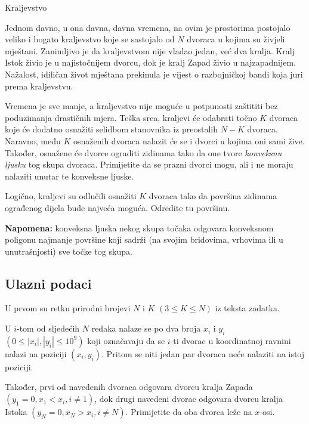 \begin{statement}[
  problempoints=100,
  timelimit=1 sekunda,
  memorylimit=512 MiB,
]{Kraljevstvo}

Jednom davno, u ona davna, davna vremena, na ovim je prostorima postojalo
veliko i bogato kraljevstvo koje se sastojalo od $N$ dvoraca u kojima su živjeli
mještani. Zanimljivo je da kraljevstvom nije vladao jedan, već dva kralja.
Kralj Istok živio je u najistočnijem dvorcu, dok je kralj Zapad živio u
najzapadnijem. Nažalost, idiličan život mještana prekinula je vijest o
razbojničkoj bandi koja juri prema kraljevstvu.

Vremena je sve manje, a kraljevstvo nije moguće u potpunosti zaštititi bez
poduzimanja drastičnih mjera. Teška srca, kraljevi će odabrati točno $K$
dvoraca koje će dodatno osnažiti selidbom stanovnika iz preostalih $N - K$
dvoraca. Naravno, među $K$ osnaženih dvoraca nalazit će se i dvorci u kojima
oni sami žive.  Također, osnažene će dvorce ograditi zidinama tako da one
tvore \textit{konveksnu ljusku} tog skupa dvoraca. Primijetite da se prazni
dvorci mogu, ali i ne moraju nalaziti unutar te konveksne ljuske.

Logično, kraljevi su odlučili osnažiti $K$ dvoraca tako da površina zidinama
ograđenog dijela bude najveća moguća. Odredite tu površinu.

\textbf{Napomena:} konveksna ljuska nekog skupa točaka odgovara konveksnom
poligonu najmanje površine koji sadrži (na svojim bridovima, vrhovima ili
u unutrašnjosti) sve točke tog skupa.

\subsection*{Ulazni podaci}
U prvom su retku prirodni brojevi $N$ i $K$ $(3 \le K \le N)$ iz teksta zadatka.

U $i$-tom od sljedećih $N$ redaka nalaze se po dva broja $x_i$ i $y_i$ $(0 \leq
|x_i|, |y_i| \leq 10^9)$ koji označavaju da se $i$-ti dvorac u koordinatnoj
ravnini nalazi na poziciji $(x_i, y_i)$. Pritom se niti jedan par dvoraca neće
nalaziti na istoj poziciji.

Također, prvi od navedenih dvoraca odgovara dvorcu kralja Zapada $(y_1 = 0, x_1
< x_i, i \ne 1)$, dok drugi navedeni dvorac odgovara dvorcu kralja Istoka
$(y_N = 0, x_N > x_i, i \ne N)$. Primijetite da oba dvorca leže na $x$-osi.


\end{statement}
